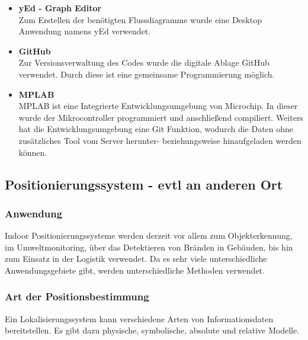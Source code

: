\begin{itemize}
    \begin{itemize}
      \item \textbf{yEd - Graph Editor}\\ \cite{Tool_yed}
      Zum Erstellen der benötigten Flussdiagramme wurde eine Desktop Anwendung namens yEd verwendet.
      \item \textbf{GitHub}\\ \cite{Tool_github}
      Zur Versionsverwaltung des Codes wurde die digitale Ablage GitHub verwendet. Durch diese ist eine gemeinsame Programmierung möglich.
      \item \textbf{MPLAB}\\ \cite{Tool_mplab}
      MPLAB ist eine Integrierte Entwicklungsumgebung von Microchip. In dieser wurde der Mikrocontroller programmiert und anschließend compiliert.
      Weiters hat die Entwicklungsumgebung eine Git Funktion, wodurch die Daten ohne zusätzliches Tool vom Server herunter- beziehungsweise hinaufgeladen werden können. 
    \end{itemize}


  \subsection{Positionierungssystem - evtl an anderen Ort}

    \subsubsection{Anwendung}
    Indoor Positionierungssysteme werden derzeit vor allem zum Objekterkennung, im Umweltmonitoring, über das Detektieren von Bränden in Gebäuden,
    bis hin zum Einsatz in der Logistik verwendet. Da es sehr viele unterschiedliche Anwendungsgebiete gibt, werden unterschiedliche Methoden verwendet.

    \subsubsection{Art der Positionsbestimmung}

    Ein Lokalisierungssystem kann verschiedene Arten von Informationsdaten bereitstellen. Es gibt dazu physische, symbolische, absolute und relative Modelle.


\end{itemize}
